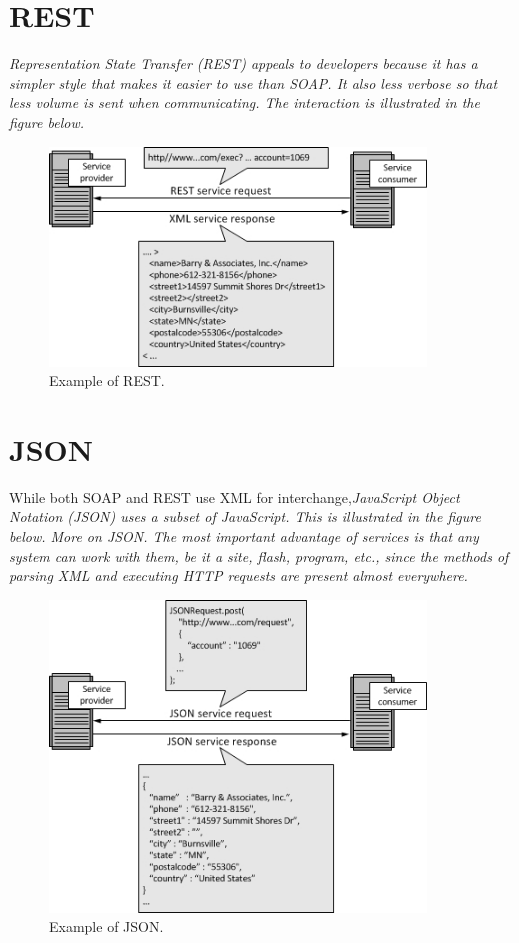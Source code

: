\documentclass[12pt,a4paper]{report}
\begin{document}
	\section{REST}
\itshape	Representation State Transfer \normalfont  (REST) appeals to developers because it has a simpler style that makes it easier to use than SOAP. It also less verbose so that less volume is sent when communicating. The interaction is illustrated in the figure below. 
	
	\begin{figure}[h]
		\centering
		\includegraphics[width=10cm]{REST.jpg}
		\caption{Example of REST.}
	\end{figure}
	
	\section{JSON}
	While both SOAP and REST use XML for interchange,\itshape JavaScript Object Notation \normalfont (JSON) uses a subset of JavaScript. This is illustrated in the figure below. More on JSON.
	The most important advantage of services is that any system can work with them, be it a site, flash, program, etc., since the methods of parsing XML and executing HTTP requests are present almost 
	everywhere.
	
		\begin{figure}[h]
			\centering
			\includegraphics[width=10cm]{JSON.jpg}
			\caption{Example of JSON.}
		\end{figure}
\newpage	
\end{document}
